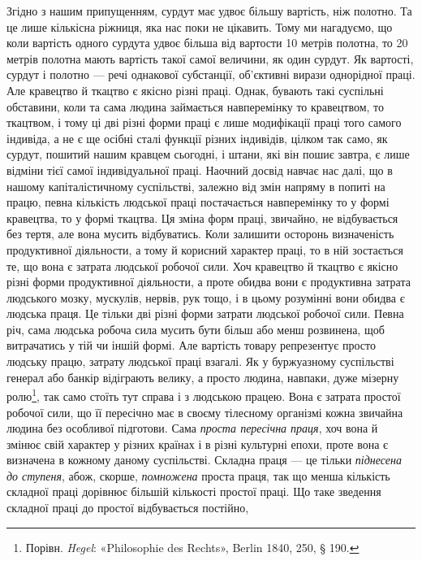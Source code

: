 Згідно з нашим припущенням, сурдут має удвоє більшу вартість,
ніж полотно. Та це лише кількісна ріжниця, яка нас поки
не цікавить. Тому ми нагадуємо, що коли вартість одного
сурдута удвоє більша від вартости 10 метрів полотна, то 20 метрів
полотна мають вартість такої самої величини, як один сурдут. Як
вартості, сурдут і полотно — речі однакової субстанції, об’єктивні
вирази однорідної праці. Але кравецтво й ткацтво є якісно
різні праці. Однак, бувають такі суспільні обставини, коли та
сама людина займається навперемінку то кравецтвом, то ткацтвом,
і тому ці дві різні форми праці є лише модифікації праці
того самого індивіда, а не є ще осібні сталі функції різних індивідів,
цілком так само, як сурдут, пошитий нашим кравцем сьогодні,
і штани, які він пошиє завтра, є лише відміни тієї самої
індивідуальної праці. Наочний досвід навчає нас далі, що в нашому
капіталістичному суспільстві, залежно від змін напряму
в попиті на працю, певна кількість людської праці постачається
навперемінку то у формі кравецтва, то у формі ткацтва. Ця зміна
форм праці, звичайно, не відбувається без тертя, але вона мусить
відбуватись. Коли залишити осторонь визначеність продуктивної
діяльности, а тому й корисний характер праці, то в ній зостається
те, що вона є затрата людської робочої сили. Хоч кравецтво й
ткацтво є якісно різні форми продуктивної діяльности, а проте
обидва вони є продуктивна затрата людського мозку, мускулів,
нервів, рук тощо, і в цьому розумінні вони обидва є людська праця.
Це тільки дві різні форми затрати людської робочої сили. Певна
річ, сама людська робоча сила мусить бути більш або менш розвинена,
щоб витрачатись у тій чи іншій формі. Але вартість товару
репрезентує просто людську працю, затрату людської праці
взагалі. Як у буржуазному суспільстві генерал або банкір відіграють
велику, а просто людина, навпаки, дуже мізерну ролю\footnote{
Порівн. \emph{Hegel}: «Philosophie des Rechts», Berlin 1840, \stor{}250,
§ 190.
},
так само стоїть тут справа і з людською працею. Вона є затрата
простої робочої сили, що її пересічно має в своєму тілесному
організмі кожна звичайна людина без особливої підготови. Сама
\emph{проста пересічна праця}, хоч вона й змінює свій характер у різних
країнах і в різні культурні епохи, проте вона є визначена в кожному
даному суспільстві. Складна праця — це тільки \emph{піднесена
до ступеня}, абож, скорше, \emph{помножена} проста праця, так що менша
кількість складної праці дорівнює більшій кількості простої праці.
Що таке зведення складної праці до простої відбувається постійно,
